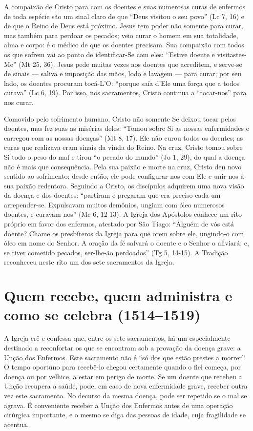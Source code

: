 A compaixão de Cristo para com os doentes e suas numerosas curas de enfermos de toda espécie são um sinal claro de que ``Deus visitou o seu povo'' (Lc 7, 16) e de que o Reino de Deus está próximo. Jesus tem poder não somente para curar, mas também para perdoar os pecados; veio curar o homem em sua totalidade, alma e corpo: é o médico de que os doentes precisam. Sua compaixão com todos os que sofrem vai ao ponto de identificar-Se com eles: ``Estive doente e visitastes-Me'' (Mt 25, 36). Jesus pede muitas vezes aos doentes que acreditem, e serve-se de sinais --- saliva e imposição das mãos, lodo e lavagem --- para curar; por seu lado, os doentes procuram tocá-L'O: ``porque saía d'Ele uma força que a todos curava'' (Lc 6, 19). Por isso, nos sacramentos, Cristo continua a ``tocar-nos'' para nos curar.

Comovido pelo sofrimento humano, Cristo não somente Se deixou tocar pelos doentes, mas fez suas as misérias deles: ``Tomou sobre Si as nossas enfermidades e carregou com as nossas doenças'' (Mt 8, 17). Ele não curou todos os doentes; as curas que realizava eram sinais da vinda do Reino. Na cruz, Cristo tomou sobre Si todo o peso do mal e tirou ``o pecado do mundo'' (Jo 1, 29), do qual a doença não é mais que consequência. Pela sua paixão e morte na cruz, Cristo deu novo sentido ao sofrimento: desde então, ele pode configurar-nos com Ele e unir-nos à sua paixão redentora. Seguindo a Cristo, os discípulos adquirem uma nova visão da doença e dos doentes: ``partiram e pregaram que era preciso cada um arrepender-se. Expulsavam muitos demônios, ungiam com óleo numerosos doentes, e curavam-nos'' (Mc 6, 12-13). A Igreja dos Apóstolos conhece um rito próprio em favor dos enfermos, atestado por São Tiago: ``Alguém de vós está doente? Chame os presbíteros da Igreja para que orem sobre ele, ungindo-o com óleo em nome do Senhor. A oração da fé salvará o doente e o Senhor o aliviará; e, se tiver cometido pecados, ser-lhe-ão perdoados'' (Tg 5, 14-15). A Tradição reconheceu neste rito um dos sete sacramentos da Igreja.

\section{Quem recebe, quem administra e como se celebra (1514--1519)}

A Igreja crê e confessa que, entre os sete sacramentos, há um especialmente destinado a reconfortar os que se encontram sob a provação da doença grave: a Unção dos Enfermos. Este sacramento não é ``só dos que estão prestes a morrer''. O tempo oportuno para recebê-lo chegou certamente quando o fiel começa, por doença ou por velhice, a estar em perigo de morte. Se um doente que recebeu a Unção recupera a saúde, pode, em caso de nova enfermidade grave, receber outra vez este sacramento. No decurso da mesma doença, pode ser repetido se o mal se agrava. É conveniente receber a Unção dos Enfermos antes de uma operação cirúrgica importante, e o mesmo se diga das pessoas de idade, cuja fragilidade se acentua.

